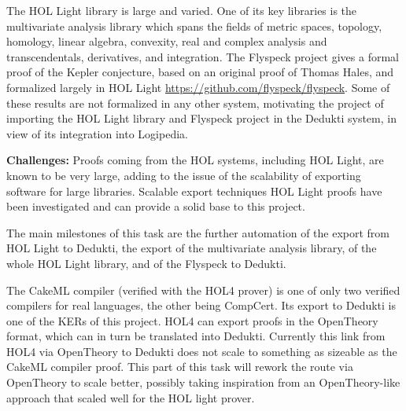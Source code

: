 \begin{workpackage}[id=libraries,type=RTD,wphases=1-48,
  short={Large libraries},%
  title={Large libraries},
  lead=Tum,
  StrRM=18,
  ChaRM=12,
  TumRM=27]
\begin{tasklist}
\begin{task}[
  id=flyspeck,
  title=The Flyspeck library,
  shorttitle=Flyspeck,
  lead=Inr,
  wphases=1-36]
The {HOL Light} library is large and varied. One of its key libraries is the
multivariate analysis library
which spans the fields of metric spaces, topology, homology, linear algebra,
convexity, real and complex analysis and transcendentals, derivatives, and
integration. The {Flyspeck} project gives a formal proof of the {Kepler}
conjecture, based on an original proof of Thomas {Hales}, and formalized
largely in {HOL Light} \url{https://github.com/flyspeck/flyspeck}.
Some of these results are not formalized in any other system, motivating the
project of importing the {HOL Light} library and {Flyspeck} project in the
{Dedukti} system, in view of its integration into {Logipedia}.

\textbf{Challenges:} Proofs coming from the HOL systems, including
       {HOL Light}, are known to be very large, adding to the issue of
       the scalability of exporting software for large
       libraries. Scalable export techniques HOL Light proofs have
       been investigated and can provide a solid base to this project.

The main milestones of this task are the further automation of the export from
{HOL Light} to {Dedukti}, the export of the multivariate analysis library, of
the whole {HOL Light} library, and of the {Flyspeck} to {Dedukti}.
\end{task}

\begin{task}[
  id=cakeml,
  title=The CakeML compiler library,
  shorttitle=CakeML,
  lead=Cha,
  ChaRM=12,
  wphases=12-23]
%
The CakeML
compiler 
(verified with the HOL4 prover) is one of only two verified compilers for real
languages, the other being CompCert. Its export to Dedukti is one of
the KERs of this project.
%
HOL4 can export proofs in the OpenTheory format, which can in turn be
translated into Dedukti. Currently this link from HOL4 via OpenTheory
to Dedukti does not scale to something as sizeable as the CakeML
compiler proof. This part of this task will rework the route via
OpenTheory to scale better, possibly taking inspiration from an
OpenTheory-like approach that scaled well for the HOL light
prover.


\end{task}
\end{tasklist}
\end{workpackage}
